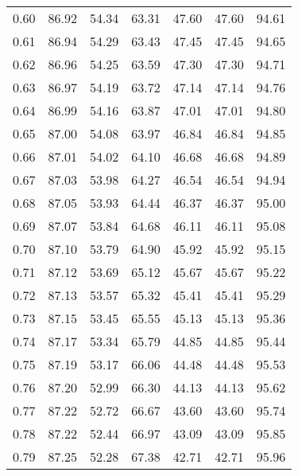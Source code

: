 \begin{tabular}{|c|c|c|c|c|c|c|}
      0.60 &     86.92 &     54.34 &      63.31 &   47.60 &      47.60 &         94.61 \\
      0.61 &     86.94 &     54.29 &      63.43 &   47.45 &      47.45 &         94.65 \\
      0.62 &     86.96 &     54.25 &      63.59 &   47.30 &      47.30 &         94.71 \\
      0.63 &     86.97 &     54.19 &      63.72 &   47.14 &      47.14 &         94.76 \\
      0.64 &     86.99 &     54.16 &      63.87 &   47.01 &      47.01 &         94.80 \\
      0.65 &     87.00 &     54.08 &      63.97 &   46.84 &      46.84 &         94.85 \\
      0.66 &     87.01 &     54.02 &      64.10 &   46.68 &      46.68 &         94.89 \\
      0.67 &     87.03 &     53.98 &      64.27 &   46.54 &      46.54 &         94.94 \\
      0.68 &     87.05 &     53.93 &      64.44 &   46.37 &      46.37 &         95.00 \\
      0.69 &     87.07 &     53.84 &      64.68 &   46.11 &      46.11 &         95.08 \\
      0.70 &     87.10 &     53.79 &      64.90 &   45.92 &      45.92 &         95.15 \\
      0.71 &     87.12 &     53.69 &      65.12 &   45.67 &      45.67 &         95.22 \\
      0.72 &     87.13 &     53.57 &      65.32 &   45.41 &      45.41 &         95.29 \\
      0.73 &     87.15 &     53.45 &      65.55 &   45.13 &      45.13 &         95.36 \\
      0.74 &     87.17 &     53.34 &      65.79 &   44.85 &      44.85 &         95.44 \\
      0.75 &     87.19 &     53.17 &      66.06 &   44.48 &      44.48 &         95.53 \\
      0.76 &     87.20 &     52.99 &      66.30 &   44.13 &      44.13 &         95.62 \\
      0.77 &     87.22 &     52.72 &      66.67 &   43.60 &      43.60 &         95.74 \\
      0.78 &     87.22 &     52.44 &      66.97 &   43.09 &      43.09 &         95.85 \\
      0.79 &     87.25 &     52.28 &      67.38 &   42.71 &      42.71 &         95.96 \\

\end{tabular}
